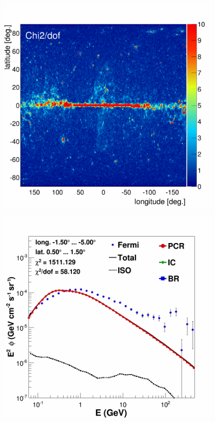 \begin{figure}[h]
  \centering
  \begin{minipage}[h]{0.45\textwidth}
	  \centering
	  \includegraphics[width=1.\linewidth]{pic/results/BKGonly_fine_chi2_distribution.png}
	  \subcaption{}
	  \label{fig:BKGonly_chi2Distribution}
  \end{minipage}
   \hfill
  \begin{minipage}[h]{0.45\textwidth}
  	\centering
	\includegraphics[width=1.\linewidth]{pic/results/BKGonly_CMZ.png}

\end{minipage}
\end{figure}
